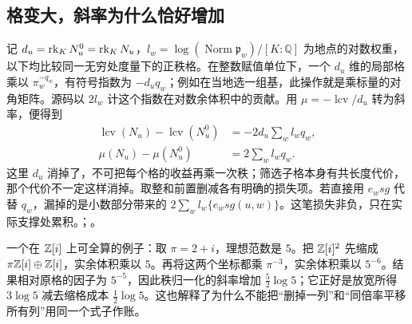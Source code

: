 \subsection{格变大，斜率为什么恰好增加}
记 $d_u=\operatorname{rk}_K N_u^0=\operatorname{rk}_K N_u$，$l_w=\log(\operatorname{Norm}\mathfrak p_w)/[K:\mathbb Q]$ 为地点的对数权重，以下均比较同一无穷处度量下的正秩格。在整数赋值单位下，一个 $d_u$ 维的局部格乘以 $\pi_w^{-q_w}$，有符号指数为 $-d_uq_w$；例如在当地选一组基，此操作就是乘标量的对角矩阵。源码以 $2l_w$ 计这个指数在对数余体积中的贡献。用 $\mu=-\operatorname{lcv}/d_u$ 转为斜率，便得到
\[
\begin{aligned}
 \operatorname{lcv}(N_u)-\operatorname{lcv}(N_u^0)
       &=-2d_u\sum_w l_w q_w,\\
 \mu(N_u)-\mu(N_u^0)&=2\sum_w l_wq_w.
\end{aligned}
\]
这里 $d_u$ 消掉了，不可把每个格的收益再乘一次秩；筛选子格本身有共长度代价，那个代价不一定这样消掉。取整和前置删减各有明确的损失项。若直接用 $e_wsg$ 代替 $q_w$，漏掉的是小数部分带来的 $2\sum_w l_w\{e_wsg(u,w)\}$。这笔损失非负，只在实际支撑处累积。；。

一个在 $\mathbb Z[i]$ 上可全算的例子：取 $\pi=2+i$，理想范数是 $5$。把 $\mathbb Z[i]^2$ 先缩成 $\pi\mathbb Z[i]\oplus\mathbb Z[i]$，实余体积乘以 $5$。再将这两个坐标都乘 $\pi^{-3}$，实余体积乘以 $5^{-6}$。结果相对原格的因子为 $5^{-5}$，因此秩归一化的斜率增加 $\tfrac52\log5$；它正好是放宽所得 $3\log5$ 减去缩格成本 $\tfrac12\log5$。这也解释了为什么不能把“删掉一列”和“同倍率平移所有列”用同一个式子作账。
